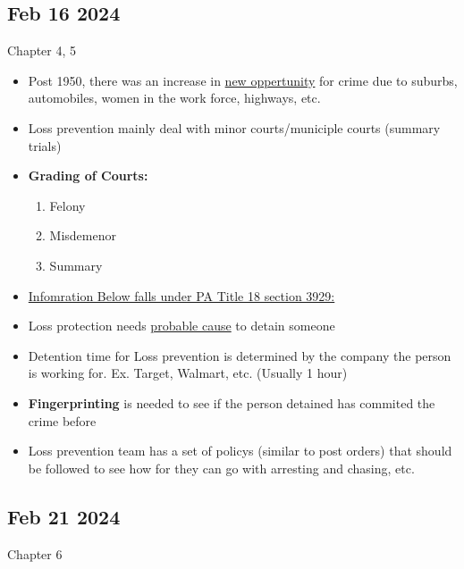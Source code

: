 \documentclass[12pt]{article}
\begin{document}
\subsection*{Feb 16 2024}

Chapter 4, 5

\begin{itemize}
		  \item Post 1950, there was an increase in \underline{new oppertunity} for crime due to
					suburbs, automobiles, women in the work force, highways, etc. 
		  \item Loss prevention mainly deal with minor courts/municiple courts (summary trials)
		  \item \textbf{Grading of Courts:}
		  		\begin{enumerate}
		  				\item Felony
						\item Misdemenor
						\item Summary
		  		\end{enumerate}
		  \item \underline{Infomration Below falls under PA Title 18 section 3929:}
		  \item Loss protection needs \underline{probable cause} to detain someone
		  \item Detention time for Loss prevention is determined by the company the person is working for. Ex.
		  		Target, Walmart, etc. (Usually 1 hour)
		  \item \textbf{Fingerprinting} is needed to see if the person detained has commited the crime before
		  \item Loss prevention team has a set of policys (similar to post orders) that should be followed
		  		to see how for they can go with arresting and chasing, etc.
\end{itemize}

\subsection*{Feb 21 2024}

Chapter 6
\end{document}
